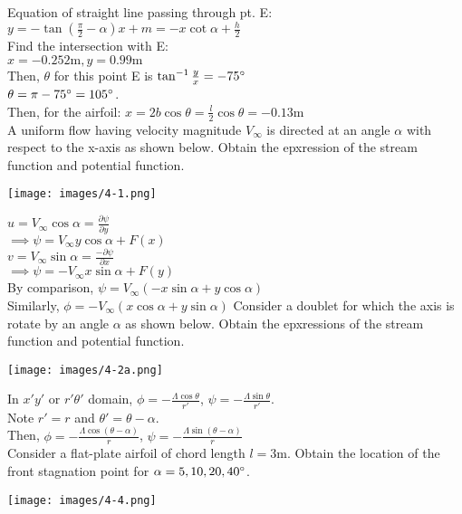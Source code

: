 \documentclass[12pt, twocolumn, letterpaper]{article}
\begin{document}
Equation of straight line passing through pt. E:\\
$y=-\tan\left(\frac{\pi}{2}-\alpha\right)x+m=-x\cot\alpha+\frac{h}{2}$\\
Find the intersection with E:\\
$x=-0.252\text{m},y=0.99\text{m}$\\
Then, $\theta$ for this point E is $\tan^{-1}\frac{y}{x}=-75\degree$\\
$\theta=\pi-75\degree=105\degree$.\\
Then, for the airfoil:
$x=2b\cos\theta=\frac{l}{2}\cos\theta=-0.13\text{m}$\\
\hline
A uniform flow having velocity magnitude $V_\infty$ is directed at an angle $\alpha$ with respect to the x-axis as shown below. Obtain the epxression of the stream function and potential function.\\
\begin{center}
    \texttt{[image: images/4-1.png]}
\end{center}
$u=V_\infty\cos\alpha=\frac{\partial \psi}{\partial y}$\\
$\implies\psi=V_\infty y\cos\alpha+ F(x)$\\
$v=V_\infty\sin\alpha=\frac{-\partial \psi}{\partial x}$\\
$\implies \psi=-V_\infty x\sin\alpha + F(y)$\\
By comparison, $\psi=V_\infty\left(-x\sin\alpha+y\cos\alpha\right)$\\
Similarly, $\phi=-V_\infty\left(x\cos\alpha+y\sin\alpha\right)$
\hline
Consider a doublet for which the axis is rotate by an angle $\alpha$ as shown below. Obtain the epxressions of the stream function and potential function.
\begin{center}
    \texttt{[image: images/4-2a.png]}
\end{center}
In $x'y'$ or $r'\theta'$ domain, $\phi=-\frac{\Lambda\cos\theta}{r'}$, $\psi=-\frac{\Lambda\sin\theta}{r'}$.\\
Note $r'=r$ and $\theta'=\theta-\alpha$.\\
Then, $\phi=-\frac{\Lambda\cos(\theta-\alpha)}{r}$, $\psi=-\frac{\Lambda\sin(\theta-\alpha)}{r}$\\
\hline
Consider a flat-plate airfoil of chord length $l=3\text{m}$. Obtain the location of the front stagnation point for $\alpha=5,10,20,40\degree$.
\begin{center}
    \texttt{[image: images/4-4.png]}
\end{center}
\end{document}
